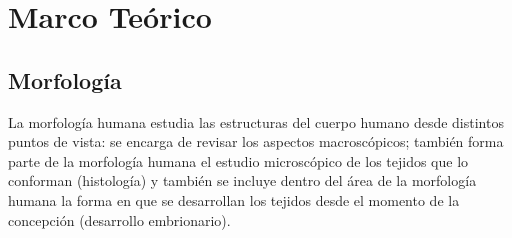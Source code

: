 \chapter{Marco Teórico}

\section{Morfología}
La morfología humana estudia las estructuras del cuerpo humano desde distintos 
puntos de vista: se encarga de revisar los aspectos macroscópicos; 
también forma parte de la morfología humana el estudio microscópico
de los tejidos que lo conforman (histología) y también se incluye dentro del 
área de la morfología humana la forma en que se 
desarrollan los tejidos desde el momento de la concepción (desarrollo embrionario).

